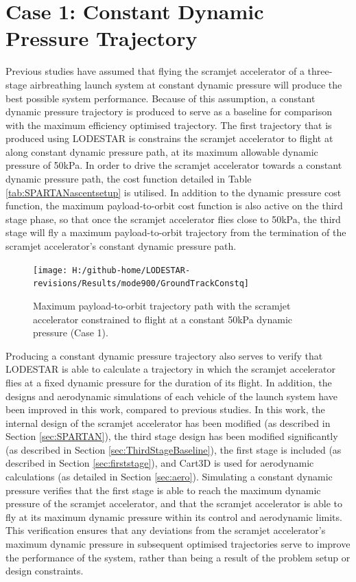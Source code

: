 \section{Case 1: Constant Dynamic Pressure Trajectory}\label{sec:constq}
\noindent
Previous studies have assumed that flying the scramjet accelerator of a three-stage airbreathing launch system at constant dynamic pressure will produce the best possible system performance\cite{Preller2017b}. Because of this assumption, a constant dynamic pressure trajectory is produced to serve as a baseline for comparison with the maximum efficiency optimised trajectory.
The first trajectory that is produced using LODESTAR is constrains the scramjet accelerator to flight at along constant dynamic pressure path, at its maximum allowable dynamic pressure of 50kPa. In order to drive the scramjet accelerator towards a constant dynamic pressure path, the cost function detailed in Table \ref{tab:SPARTANascentsetup} is utilised. In addition to the dynamic pressure cost function, the maximum payload-to-orbit cost function is also active on the third stage phase, so that once the scramjet accelerator flies close to 50kPa, the third stage will fly a maximum payload-to-orbit trajectory from the termination of the scramjet accelerator's constant dynamic pressure path.
\begin{figure}[ht]%
	\centering
	\texttt{[image: H:/github-home/LODESTAR-revisions/Results/mode900/GroundTrackConstq]}
	\caption{Maximum payload-to-orbit trajectory path with the scramjet accelerator constrained to flight at a constant 50kPa dynamic pressure (Case 1).}
	\label{fig:GroundTrackConstq}
\end{figure}

Producing a constant dynamic pressure trajectory also serves to verify that LODESTAR is able to calculate a trajectory in which the scramjet accelerator flies at a fixed dynamic pressure for the duration of its flight. 
In addition, the designs and aerodynamic simulations of each vehicle of the launch system have been improved in this work, compared to previous studies\cite{Preller2017b}. In this work, the internal design of the scramjet accelerator has been modified (as described in Section \ref{sec:SPARTAN}), the third stage design has been modified significantly (as described in Section \ref{sec:ThirdStageBaseline}), the first stage is included (as described in Section \ref{sec:firststage}), and Cart3D\cite{CART3D} is used for aerodynamic calculations (as detailed in Section \ref{sec:aero}). Simulating a constant dynamic pressure verifies that the first stage is able to reach the maximum dynamic pressure of the scramjet accelerator, and that the scramjet accelerator is able to fly at its maximum dynamic pressure within its control and aerodynamic limits. This verification ensures that any deviations from the scramjet accelerator's maximum dynamic pressure in subsequent optimised trajectories serve to improve the performance of the system, rather than being a result of the problem setup or design constraints. 

